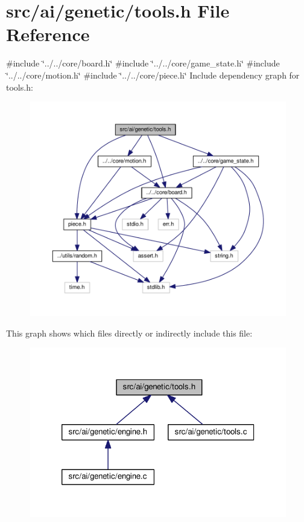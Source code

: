 \section{src/ai/genetic/tools.h File Reference}
\label{tools_8h}
{\ttfamily \#include \char`\"{}../../core/board.\+h\char`\"{}}\newline
{\ttfamily \#include \char`\"{}../../core/game\+\_\+state.\+h\char`\"{}}\newline
{\ttfamily \#include \char`\"{}../../core/motion.\+h\char`\"{}}\newline
{\ttfamily \#include \char`\"{}../../core/piece.\+h\char`\"{}}\newline
Include dependency graph for tools.\+h\+:
\nopagebreak
\begin{figure}[H]
\begin{center}
\leavevmode
\includegraphics[width=350pt]{tools_8h__incl}
\end{center}
\end{figure}
This graph shows which files directly or indirectly include this file\+:
\nopagebreak
\begin{figure}[H]
\begin{center}
\leavevmode
\includegraphics[width=320pt]{tools_8h__dep__incl}
\end{center}
\end{figure}
